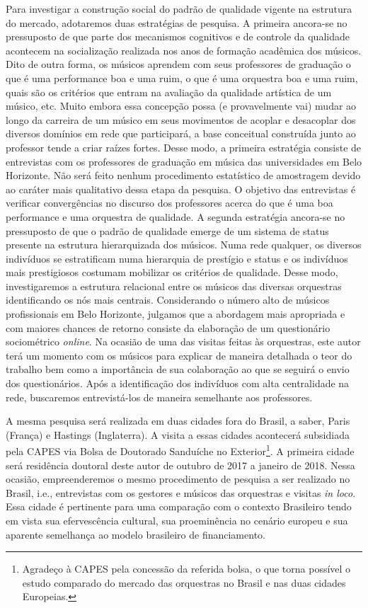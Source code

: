 \documentclass[a4paper, 12pt, openright, oneside, german, french, english, brazil]{abntex2}
\begin{document}
	Para investigar a construção social do padrão de qualidade vigente na estrutura do mercado, adotaremos duas estratégias de pesquisa. A primeira ancora-se no pressuposto de que parte dos mecanismos cognitivos e de controle da qualidade acontecem na socialização realizada nos anos de formação acadêmica dos músicos. Dito de outra forma, os músicos aprendem com seus professores de graduação o que é uma performance boa e uma ruim, o que é uma orquestra boa e uma ruim, quais são os critérios que entram na avaliação da qualidade artística de um músico, etc. Muito embora essa concepção possa (e provavelmente vai) mudar ao longo da carreira de um músico em seus movimentos de acoplar e desacoplar dos diversos domínios em rede que participará, a base conceitual construída junto ao professor tende a criar raízes fortes. Desse modo, a primeira estratégia consiste de entrevistas com os professores de graduação em música das universidades em Belo Horizonte. Não será feito nenhum procedimento estatístico de amostragem devido ao caráter mais qualitativo dessa etapa da pesquisa. O objetivo das entrevistas é verificar convergências no discurso dos professores acerca do que é uma boa performance e uma orquestra de qualidade. A segunda estratégia ancora-se no pressuposto de que o padrão de qualidade emerge de um sistema de status presente na estrutura hierarquizada dos músicos. Numa rede qualquer, os diversos indivíduos se estratificam numa hierarquia de prestígio e status e os indivíduos mais prestigiosos costumam mobilizar os critérios de qualidade. Desse modo, investigaremos a estrutura relacional entre os músicos das diversas orquestras identificando os nós mais centrais. Considerando o número alto de músicos profissionais em Belo Horizonte, julgamos que a abordagem mais apropriada e com maiores chances de retorno consiste da elaboração de um questionário sociométrico \textit{online}. Na ocasião de uma das visitas feitas às orquestras, este autor terá um momento com os músicos para explicar de maneira detalhada o teor do trabalho bem como a importância de sua colaboração ao que se seguirá o envio dos questionários. Após a identificação dos indivíduos com alta centralidade na rede, buscaremos entrevistá-los de maneira semelhante aos professores.
	
	A mesma pesquisa será realizada em duas cidades fora do Brasil, a saber, Paris (França) e Hastings (Inglaterra). A visita a essas cidades acontecerá subsidiada pela CAPES via Bolsa de Doutorado Sanduíche no Exterior\footnote{Agradeço à CAPES pela concessão da referida bolsa, o que torna possível o estudo comparado do mercado das orquestras no Brasil e nas duas cidades Europeias.}. A primeira cidade será residência doutoral deste autor de outubro de 2017 a janeiro de 2018. Nessa ocasião, empreenderemos o mesmo procedimento de pesquisa a ser realizado no Brasil, i.e., entrevistas com os gestores e músicos das orquestras e visitas \textit{in loco}. Essa cidade é pertinente para uma comparação com o contexto Brasileiro tendo em vista sua efervescência cultural, sua proeminência no cenário europeu e sua aparente semelhança ao modelo brasileiro de financiamento.
	
\end{document}
